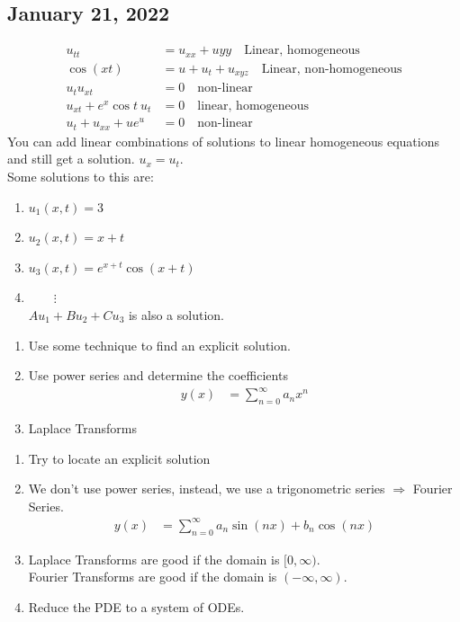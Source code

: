\documentclass{article}
\begin{document}
\subsection*{January 21, 2022}
\Ex
\begin{align}
  u_{tt} & = u_{xx} + u{yy}\quad \text{Linear, homogeneous}\\
  \cos{(xt)} & = u + u_t + u_{xyz}\quad \text{Linear, non-homogeneous}\\
  u_tu_{xt} & = 0\quad \text{non-linear}\\
  u_{xt} + e^x \cos t\ u_t & = 0\quad \text{linear, homogeneous}\\
  u_t + u_{xx} + ue^u & = 0\quad \text{non-linear}
\end{align}
\note You can add linear combinations of solutions to linear homogeneous equations and still get a solution.
\Ex $u_x = u_t$.\\
Some solutions to this are:
\begin{enumerate}
  \item $u_1(x, t) = 3$
  \item $u_2(x, t) = x + t$
  \item $u_3(x, t) = e^{x+t} \cos(x + t)$
  \item $\qquad \vdots$\\
  $Au_1 + Bu_2 + Cu_3$ is also a solution.
\end{enumerate}
\begin{enumerate}
  \item Use some technique to find an explicit solution.
  \item Use power series and determine the coefficients
  \begin{align}
    y(x) & = \sum^\infty_{n = 0} a_nx^n
  \end{align}
  \item Laplace Transforms
\end{enumerate}
\begin{enumerate}
  \item Try to locate an explicit solution
  \item We don't use power series, instead, we use a trigonometric series $\Rightarrow$ Fourier Series.
  \begin{align}
    y(x) & = \sum^\infty_{n = 0} a_n \sin(nx) + b_n \cos(nx)
  \end{align}
  \item Laplace Transforms are good if the domain is $[0, \infty)$.\\
  Fourier Transforms are good if the domain is $(-\infty, \infty)$.
  \item Reduce the PDE to a system of ODEs.
\end{enumerate}
\end{document}
